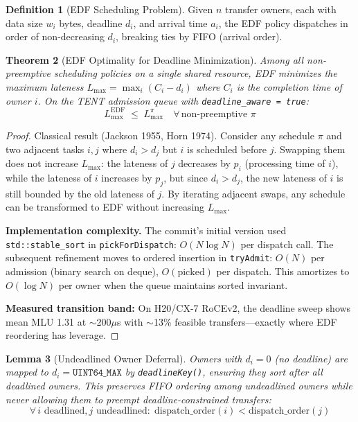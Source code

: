 \documentclass[11pt,a4paper,twoside]{article}
\theoremstyle{plain}
\newtheorem{theorem}{Theorem}[section]
\newtheorem{lemma}[theorem]{Lemma}
\theoremstyle{definition}
\newtheorem{definition}[theorem]{Definition}
\theoremstyle{remark}
\begin{document}
\begin{definition}[EDF Scheduling Problem]
\label{def:edf}
Given $n$ transfer owners, each with data size $w_i$ bytes, deadline $d_i$, and
arrival time $a_i$, the EDF policy dispatches in order of non-decreasing $d_i$,
breaking ties by FIFO (arrival order).
\end{definition}

\begin{theorem}[EDF Optimality for Deadline Minimization]
\label{thm:edf-optimal}
Among all non-preemptive scheduling policies on a single shared resource,
EDF minimizes the maximum lateness $L_{\max} = \max_i (C_i - d_i)$ where $C_i$
is the completion time of owner $i$.  On the TENT admission queue with
\texttt{deadline\_aware = true}:
\begin{equation}
  L_{\max}^{\text{EDF}} \;\leq\; L_{\max}^{\pi}
  \quad\forall\,\text{non-preemptive } \pi
\end{equation}
\end{theorem}

\begin{proof}
Classical result (Jackson 1955, Horn 1974). Consider any schedule $\pi$ and two
adjacent tasks $i, j$ where $d_i > d_j$ but $i$ is scheduled before $j$. Swapping
them does not increase $L_{\max}$: the lateness of $j$ decreases by $p_i$
(processing time of $i$), while the lateness of $i$ increases by $p_j$, but since
$d_i > d_j$, the new lateness of $i$ is still bounded by the old lateness of $j$.
By iterating adjacent swaps, any schedule can be transformed to EDF without
increasing $L_{\max}$.

\textbf{Implementation complexity.} The commit's initial version used
\texttt{std::stable\_sort} in \texttt{pickForDispatch}: $O(N \log N)$ per dispatch call.
The subsequent refinement moves to ordered insertion in \texttt{tryAdmit}:
$O(N)$ per admission (binary search on deque), $O(\text{picked})$ per dispatch.
This amortizes to $O(\log N)$ per owner when the queue maintains sorted invariant.

\textbf{Measured transition band:} On H20/CX-7 RoCEv2, the deadline sweep shows
mean MLU 1.31 at $\sim$200$\mu$s with $\sim$13\% feasible transfers---exactly
where EDF reordering has leverage.
\end{proof}

\begin{lemma}[Undeadlined Owner Deferral]
\label{lem:undeadlined}
Owners with $d_i = 0$ (no deadline) are mapped to $d_i = \texttt{UINT64\_MAX}$ by
\texttt{deadlineKey()}, ensuring they sort after all deadlined owners. This preserves
FIFO ordering among undeadlined owners while never allowing them to preempt
deadline-constrained transfers:
\begin{equation}
  \forall\, i \text{ deadlined}, j \text{ undeadlined}: \;
  \text{dispatch\_order}(i) < \text{dispatch\_order}(j)
\end{equation}
\end{lemma}
\end{document}
